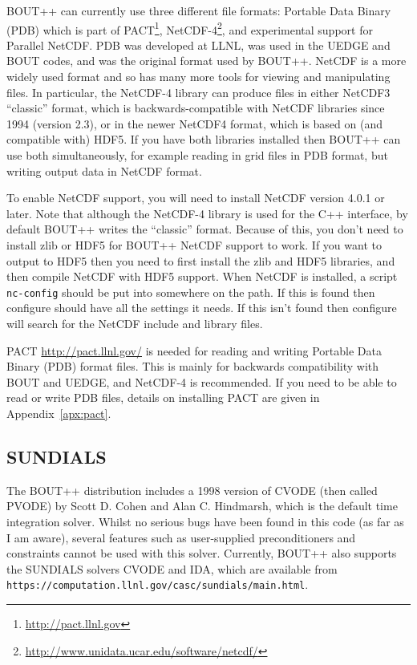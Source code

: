 \documentclass[12pt]{article}
\newcommand{\code}[1]{\texttt{#1}}
\begin{document}
BOUT++ can currently use three different file formats: Portable Data Binary
(PDB) which is part of PACT\footnote{\url{http://pact.llnl.gov}},
NetCDF-4\footnote{\url{http://www.unidata.ucar.edu/software/netcdf/}},
and experimental support for Parallel NetCDF.
PDB was developed at LLNL, was used in the UEDGE and BOUT codes, and
was the original format used by BOUT++. NetCDF is a more widely used
format and so has many more tools for viewing and manipulating files.
In particular, the NetCDF-4 library can produce files in either
NetCDF3 ``classic'' format, which is backwards-compatible with NetCDF
libraries since 1994 (version 2.3), or in the newer NetCDF4 format,
which is based on (and compatible with) HDF5. If you have both libraries
installed then BOUT++ can use both simultaneously, for example reading in
grid files in PDB format, but writing output data in NetCDF format.

To enable NetCDF support, you will need to install NetCDF version 4.0.1 or later.
Note that although the NetCDF-4 library is used for the C++ interface, by default
BOUT++ writes the ``classic'' format. Because of this, you don't need to install zlib or HDF5
for BOUT++ NetCDF support to work.  If you want to output to HDF5 then you need to first install
  the zlib and HDF5 libraries, and then compile NetCDF with HDF5 support.
When NetCDF is installed, a script \texttt{nc-config}
should be put into somewhere on the path. If this is found then configure
should have all the settings it needs. If this isn't found then configure
will search for the NetCDF include and library files.

PACT \url{http://pact.llnl.gov/} is needed for reading and writing Portable Data Binary (PDB) format files. This is mainly for backwards compatibility with BOUT and UEDGE, and NetCDF-4 is recommended.
If you need to be able to read or write PDB files, details on installing PACT are given in Appendix~\ref{apx:pact}.

\subsection{SUNDIALS}

The BOUT++ distribution includes a 1998 version of CVODE (then called PVODE) by Scott D. Cohen and Alan C.
Hindmarsh, which is the default time integration solver.
Whilst no serious bugs have been found in this code
(as far as I am aware), several features such as user-supplied preconditioners and constraints cannot
be used with this solver. Currently, BOUT++ also supports the SUNDIALS solvers CVODE and
IDA, which are available from \code{https://computation.llnl.gov/casc/sundials/main.html}.
\end{document}
